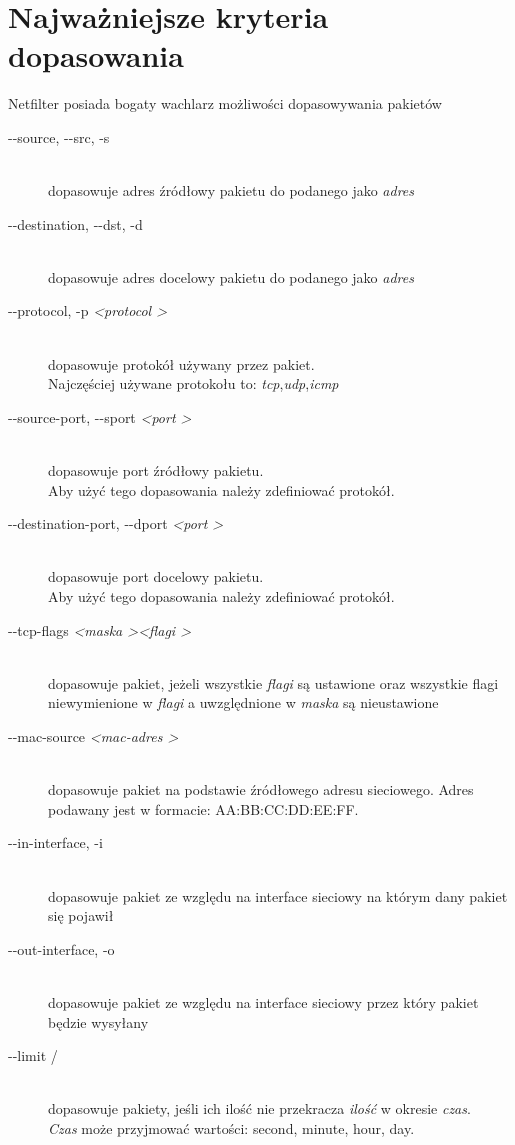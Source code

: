 	\section{Najważniejsze kryteria dopasowania}
		Netfilter posiada bogaty wachlarz możliwości dopasowywania pakietów
		\begin{description}
			\item[-{}-source, -{}-src, -s  ] \hfill \\
				dopasowuje adres źródłowy pakietu do podanego jako \textit{adres}
			\item[-{}-destination, -{}-dst, -d ] \hfill\\
				dopasowuje adres docelowy pakietu do podanego jako \textit{adres}
			\item[-{}-protocol, -p \textit{\textless protocol \textgreater}] \hfill \\
				dopasowuje protokół używany przez pakiet.\\
				Najczęściej używane protokołu to: \textit{tcp},\textit{udp},\textit{icmp}
			\item[-{}-source-port, -{}-sport \textit{\textless port \textgreater} ]\hfill\\
				dopasowuje port źródłowy pakietu.\\
				Aby użyć tego dopasowania należy zdefiniować protokół.
			\item[-{}-destination-port, -{}-dport \textit{\textless port \textgreater}] \hfill \\
				dopasowuje port docelowy pakietu.\\
				Aby użyć tego dopasowania należy zdefiniować protokół.
			\item[-{}-tcp-flags \textit{\textless maska \textgreater \textless flagi \textgreater}] \hfill \\
				dopasowuje pakiet, jeżeli wszystkie \textit{flagi} są ustawione oraz wszystkie flagi niewymienione w \textit{flagi} a uwzględnione w \textit{maska} są nieustawione
			\item[-{}-mac-source \textit{\textless mac-adres \textgreater}] \hfill \\
				dopasowuje pakiet na podstawie źródłowego adresu sieciowego. Adres podawany jest w formacie: AA:BB:CC:DD:EE:FF.
			\item[-{}-in-interface, -i ] \hfill \\
				dopasowuje pakiet ze względu na interface sieciowy na którym dany pakiet się pojawił	
			\item[-{}-out-interface, -o ] \hfill \\
				dopasowuje pakiet ze względu na interface sieciowy przez który pakiet będzie wysyłany
			\item[-{}-limit /] \hfill \\
				dopasowuje pakiety, jeśli ich ilość nie przekracza \textit{ilość} w okresie \textit{czas}.\\
				\textit{Czas} może przyjmować wartości: second, minute, hour, day.
		\end{description}
